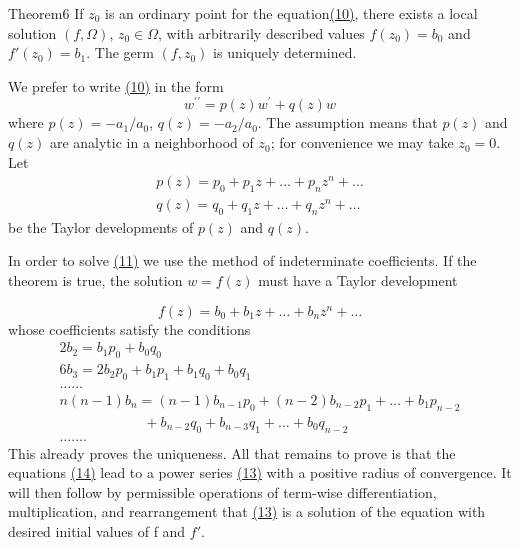 \begin{originalstatement}{Theorem}{6}\label{thm:8.6}
If $z_0$ is an ordinary point for the equation\hyperref[eq:8.10]{(10)}, there exists a local solution $(f, \Omega)$, $z_0 \in \Omega$, with arbitrarily described values $f(z_0) = b_0$ and $f'(z_0) = b_1$. The germ $(f, z_0)$ is uniquely determined.
\end{originalstatement}
We prefer to write \hyperref[eq:8.10]{(10)} in the form
\begin{equation*}
w ^ {\prime \prime} = p (z) w ^ {\prime} + q (z) w\tag{11}\label{eq:8.11}
\end{equation*}
where $p(z) = -a_1 / a_0$, $q(z) = -a_2 / a_0$. The assumption means that $p(z)$ and $q(z)$ are analytic in a neighborhood of $z_0$; for convenience we may take $z_0 = 0$. Let
\begin{equation*}
\begin{array}{l} p (z) = p _ {0} + p _ {1} z + \dots + p _ {n} z ^ {n} + \dots \\ q (z) = q _ {0} + q _ {1} z + \dots + q _ {n} z ^ {n} + \dots \end{array}\tag{12}\label{eq:8.12}
\end{equation*}
be the Taylor developments of $p(z)$ and $q(z)$.

In order to solve \hyperref[eq:8.11]{(11)} we use the method of indeterminate coefficients. If the theorem is true, the solution $w = f(z)$ must have a Taylor development


\begin{equation*}
f (z) = b _ {0} + b _ {1} z + \dots + b _ {n} z ^ {n} + \dots\tag{13}\label{eq:8.13}
\end{equation*}
whose coefficients satisfy the conditions
\begin{equation*}
\begin{array}{l} 2 b _ {2} = b _ {1} p _ {0} + b _ {0} q _ {0} \\ 6 b _ {3} = 2 b _ {2} p _ {0} + b _ {1} p _ {1} + b _ {1} q _ {0} + b _ {0} q _ {1} \\ \dots \dots \\ n (n - 1) b _ {n} = (n - 1) b _ {n - 1} p _ {0} + (n - 2) b _ {n - 2} p _ {1} + \dots + b _ {1} p _ {n - 2} \\ \qquad \qquad \qquad + b _ {n - 2} q _ {0} + b _ {n - 3} q _ {1} + \dots + b _ {0} q _ {n - 2} \\ \dots \dots . \end{array}\tag{14}\label{eq:8.14}
\end{equation*}
This already proves the uniqueness. All that remains to prove is that the equations \hyperref[eq:8.14]{(14)} lead to a power series \hyperref[eq:8.13]{(13)} with a positive radius of convergence. It will then follow by permissible operations of term-wise differentiation, multiplication, and rearrangement that \hyperref[eq:8.13]{(13)} is a solution of the equation with desired initial values of f and $f'$.

